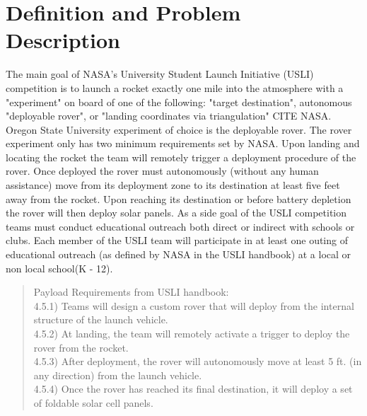 \documentclass[onecolumn, draftclsnofoot,10pt, compsoc]{IEEEtran}
\begin{document}
\section{Definition and Problem Description}
The main goal of NASA's University Student Launch Initiative (USLI) competition is to launch a rocket exactly one mile into the atmosphere with a "experiment" on board of one of the following: "target destination", autonomous "deployable rover", or "landing coordinates via triangulation" CITE NASA. Oregon State University experiment of choice is the deployable rover. The rover experiment only has two minimum requirements set by NASA. Upon landing and locating the rocket the team will remotely trigger a deployment procedure of the rover. Once deployed the rover must autonomously (without any human assistance) move from its deployment zone to its destination at least five feet away from the rocket. Upon reaching its destination or before battery depletion the rover will then deploy solar panels. As a side goal of the USLI competition teams must conduct educational outreach both direct or indirect with schools or clubs. Each member of the USLI team will participate in at least one outing of educational outreach (as defined by NASA in the USLI handbook) at a local or non local school(K - 12).

\begin{quote}
Payload Requirements from USLI handbook:\\
4.5.1) Teams will design a custom rover that will deploy from the internal structure of the launch vehicle.\\
4.5.2) At landing, the team will remotely activate a trigger to deploy the rover from the rocket.\\
4.5.3) After deployment, the rover will autonomously move at least 5 ft. (in any direction) from the launch vehicle.\\
4.5.4) Once the rover has reached its final destination, it will deploy a set of foldable solar cell panels.\\
\end{quote}\cite{USLI_handbook}
\end{document}
